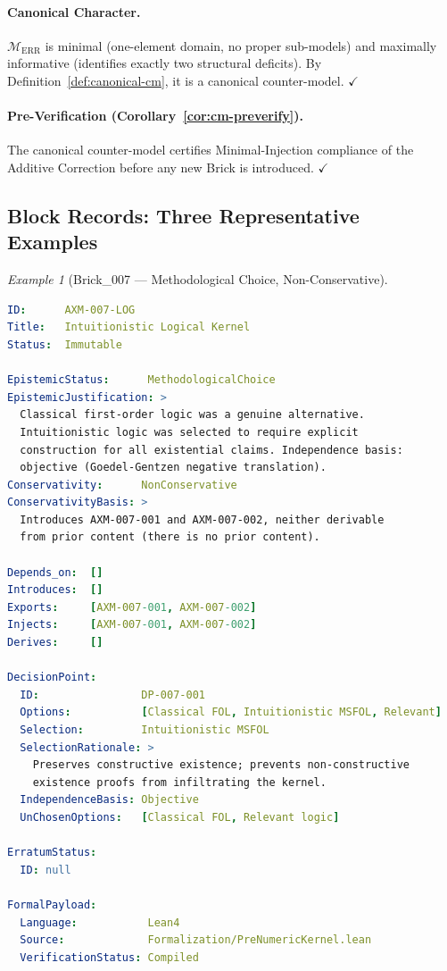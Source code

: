 \documentclass[12pt, a4paper]{article}
\theoremstyle{plain}
\theoremstyle{definition}
\theoremstyle{remark}
\newtheorem{example}[theorem]{Example}
\begin{document}
\paragraph{Canonical Character.}
$\mathcal{M}_{\mathrm{ERR}}$ is minimal (one-element domain, no
proper sub-models) and maximally informative (identifies exactly two
structural deficits). By Definition~\ref{def:canonical-cm}, it is a
canonical counter-model. $\checkmark$

\paragraph{Pre-Verification (Corollary~\ref{cor:cm-preverify}).}
The canonical counter-model certifies Minimal-Injection compliance of
the Additive Correction before any new Brick is introduced. $\checkmark$

\subsection{Block Records: Three Representative Examples}
\label{subsec:ex-records}

\begin{example}[Brick\_007 --- Methodological Choice, Non-Conservative]
\label{ex:brick007}
\begin{lstlisting}[language=yaml]
ID:      AXM-007-LOG
Title:   Intuitionistic Logical Kernel
Status:  Immutable

EpistemicStatus:      MethodologicalChoice
EpistemicJustification: >
  Classical first-order logic was a genuine alternative.
  Intuitionistic logic was selected to require explicit
  construction for all existential claims. Independence basis:
  objective (Goedel-Gentzen negative translation).
Conservativity:      NonConservative
ConservativityBasis: >
  Introduces AXM-007-001 and AXM-007-002, neither derivable
  from prior content (there is no prior content).

Depends_on:  []
Introduces:  []
Exports:     [AXM-007-001, AXM-007-002]
Injects:     [AXM-007-001, AXM-007-002]
Derives:     []

DecisionPoint:
  ID:                DP-007-001
  Options:           [Classical FOL, Intuitionistic MSFOL, Relevant]
  Selection:         Intuitionistic MSFOL
  SelectionRationale: >
    Preserves constructive existence; prevents non-constructive
    existence proofs from infiltrating the kernel.
  IndependenceBasis: Objective
  UnChosenOptions:   [Classical FOL, Relevant logic]

ErratumStatus:
  ID: null

FormalPayload:
  Language:           Lean4
  Source:             Formalization/PreNumericKernel.lean
  VerificationStatus: Compiled
\end{lstlisting}
\end{example}
\end{document}
